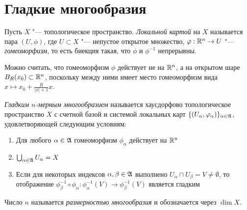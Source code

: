 \section{Гладкие многообразия}

\begin{definition}
	Пусть $X$ "--- топологическое пространство. \textit{Локальной картой} на $X$ называется пара $(U, \phi)$, где $U \subset X$ "--- непустое открытое множество, $\varphi: \mathbb{R}^n \to U$ "--- \textit{гомеоморфизм}, то есть биекция такая, что $\phi$ и $\phi^{-1}$ непрерывны.
\end{definition}

\begin{note}
	Можно считать, что гомеоморфизм $\phi$ действует не на $\mathbb{R}^n$, а на открытом шаре $B_R(x_0) \subset \mathbb{R}^n$, поскольку между ними имеет место гомеоморфизм вида $x \mapsto x_0 + \frac R{|x| + 1}x$.
\end{note}

\begin{definition}
	\textit{Гладким $n$-мерным многообразием} называется хаусдорфово топологическое пространство $X$ с счетной базой и системой локальных карт $\{(U_\alpha, \varphi_\alpha)\}_{\alpha \in \mathfrak A}$, удовлетворяющей следующим условиям:
	\begin{enumerate}
		\item Для любого $\alpha \in \mathfrak A$ гомеоморфизм $\phi_\alpha$ действует на $\mathbb{R}^n$
		\item $\bigcup_{\alpha \in \mathfrak A}U_\alpha = X$
		\item Если для некоторых индексов $\alpha, \beta \in \mathfrak A$ выполнено $U_\alpha \cap U_\beta = V \ne \emptyset$, то отображение $\phi_\beta^{-1} \circ \phi_\alpha : \phi_\alpha^{-1}(V) \to \phi_\beta^{-1}(V)$ является гладким
	\end{enumerate}
	
Число $n$ называется \textit{размерностью многообразия} и обозначается через $\dim{X}$.
\end{definition}


